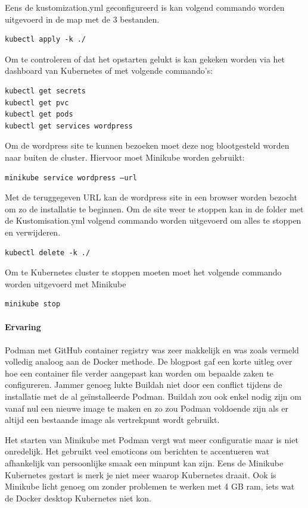 Eens de kustomization.yml geconfigureerd is kan volgend commando worden uitgevoerd in de map met de 3 bestanden.
\begin{verbatim}
kubectl apply -k ./
\end{verbatim}
Om te controleren of dat het opstarten gelukt is kan gekeken worden via het dashboard van Kubernetes of met volgende commando’s:
\begin{verbatim}
kubectl get secrets
kubectl get pvc
kubectl get pods
kubectl get services wordpress
\end{verbatim}
Om de wordpress site te kunnen bezoeken moet deze nog blootgesteld worden naar buiten de cluster. Hiervoor moet Minikube worden gebruikt:
\begin{verbatim}
minikube service wordpress –url
\end{verbatim}
Met de teruggegeven URL kan de wordpress site in een browser worden bezocht om zo de installatie te beginnen.
Om de site weer te stoppen kan in de folder met de Kustomisation.yml volgend commando worden uitgevoerd om alles te stoppen en verwijderen.
\begin{verbatim}
kubectl delete -k ./
\end{verbatim}

Om te Kubernetes cluster te stoppen moeten moet het volgende commando worden uitgevoerd met Minikube
\begin{verbatim}
minikube stop
\end{verbatim}

\paragraph{Ervaring}
Podman met GitHub container registry was zeer makkelijk en was zoals vermeld volledig analoog aan de Docker methode. De blogpost gaf een korte uitleg over hoe een container file verder aangepast kan worden om bepaalde zaken te configureren. Jammer genoeg lukte Buildah niet door een conflict tijdens de installatie met de al geïnstalleerde Podman. Buildah zou ook enkel nodig zijn om vanaf nul een nieuwe image te maken en zo zou Podman voldoende zijn als er altijd een bestaande image als vertrekpunt wordt gebruikt.

Het starten van Minikube met Podman vergt wat meer configuratie maar is niet onredelijk. Het gebruikt veel emoticons om berichten te accentueren wat afhankelijk van persoonlijke smaak een minpunt kan zijn. Eens de Minikube Kubernetes gestart is merk je niet meer waarop Kubernetes draait. Ook is Minikube licht genoeg om zonder problemen te werken met 4 GB ram, iets wat de Docker desktop Kubernetes niet kon.

